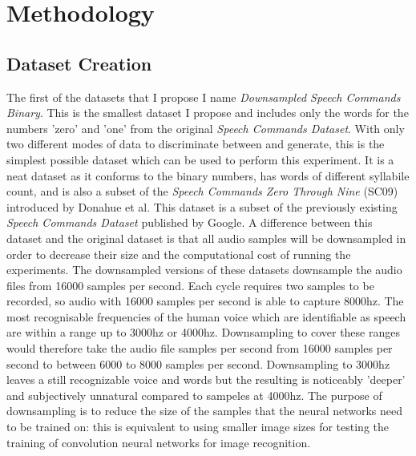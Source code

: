 \documentclass[a4paper, titlepage]{article}
\begin{document}
\section{Methodology}

\subsection{Dataset Creation}

The first of the datasets that I propose I name \textit{Downsampled Speech Commands Binary}.
This is the smallest dataset I propose and includes only the words for the numbers 'zero' and 'one' from the original \textit{Speech Commands Dataset}.
With only two different modes of data to discriminate between and generate, this is the simplest possible dataset which can be used to perform this experiment.
It is a neat dataset as it conforms to the binary numbers, has words of different syllabile count, and is also a subset of the \textit{Speech Commands Zero Through Nine} (SC09) introduced by Donahue et al.
\newline
\newline
This dataset is a subset of the previously existing \textit{Speech Commands Dataset} \cite{Google_Research_blog_2017} published by Google.
A difference between this dataset and the original dataset is that all audio samples will be downsampled in order to decrease their size and the computational cost of running the experiments.
\newline
\newline
The downsampled versions of these datasets downsample the audio files from 16000 samples per second.
Each cycle requires two samples to be recorded, so audio with 16000 samples per second is able to capture 8000hz.
The most recognisable frequencies of the human voice which are identifiable as speech are within a range up to 3000hz or 4000hz.
Downsampling to cover these ranges would therefore take the audio file samples per second from 16000 samples per second to between 6000 to 8000 samples per second.
Downsampling to 3000hz leaves a still recognizable voice and words but the resulting is noticeably 'deeper' and subjectively unnatural compared to sampeles at 4000hz.
\newline
\newline
The purpose of downsampling is to reduce the size of the samples that the neural networks need to be trained on: this is equivalent to using smaller image sizes for testing the training of convolution neural networks for image recognition.
\end{document}
